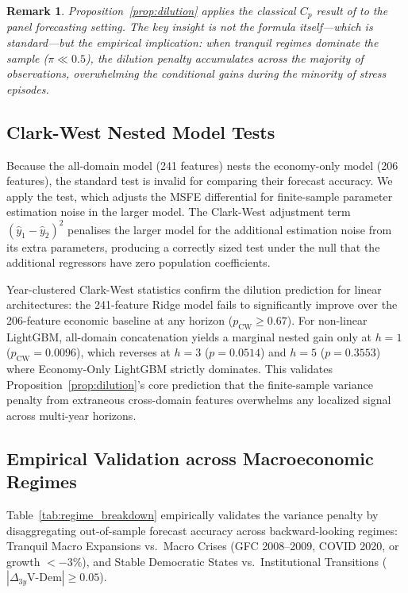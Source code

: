 \documentclass[11pt,a4paper]{article}
\newtheorem{remark}{Remark}
\begin{document}
\begin{remark}
Proposition~\ref{prop:dilution} applies the classical $C_p$ result of \citet{mallows1973} to the panel forecasting setting. The key insight is not the formula itself---which is standard---but the empirical implication: when tranquil regimes dominate the sample ($\pi \ll 0.5$), the dilution penalty accumulates across the majority of observations, overwhelming the conditional gains during the minority of stress episodes.
\end{remark}

\subsection{Clark-West Nested Model Tests}
\label{sec:clark_west}

Because the all-domain model (241 features) nests the economy-only model (206 features), the standard \citet{diebold1995} test is invalid for comparing their forecast accuracy. We apply the \citet{clark2007} test, which adjusts the MSFE differential for finite-sample parameter estimation noise in the larger model. The Clark-West adjustment term $({\hat{y}}_1 - {\hat{y}}_2)^2$ penalises the larger model for the additional estimation noise from its extra parameters, producing a correctly sized test under the null that the additional regressors have zero population coefficients.

Year-clustered Clark-West statistics confirm the dilution prediction for linear architectures: the 241-feature Ridge model fails to significantly improve over the 206-feature economic baseline at any horizon ($p_{\text{CW}} \ge 0.67$). For non-linear LightGBM, all-domain concatenation yields a marginal nested gain only at $h=1$ ($p_{\text{CW}} = 0.0096$), which reverses at $h=3$ ($p = 0.0514$) and $h=5$ ($p = 0.3553$) where Economy-Only LightGBM strictly dominates. This validates Proposition~\ref{prop:dilution}'s core prediction that the finite-sample variance penalty from extraneous cross-domain features overwhelms any localized signal across multi-year horizons.

\subsection{Empirical Validation across Macroeconomic Regimes}

Table~\ref{tab:regime_breakdown} empirically validates the variance penalty by disaggregating out-of-sample forecast accuracy across backward-looking regimes: Tranquil Macro Expansions vs.\ Macro Crises (GFC 2008--2009, COVID 2020, or growth $< -3\%$), and Stable Democratic States vs.\ Institutional Transitions ($|\Delta_{3y} \text{V-Dem}| \ge 0.05$).
\end{document}
